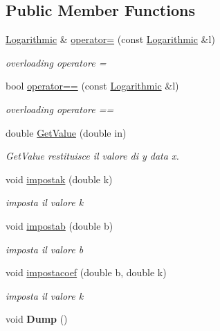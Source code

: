 \subsection*{\-Public \-Member \-Functions}
\begin{DoxyCompactItemize}
\item 
\hypertarget{class_logarithmic_a60e9e7d6a2827bb6af33ac837de86f15}{\hyperlink{class_logarithmic}{\-Logarithmic} \& \hyperlink{class_logarithmic_a60e9e7d6a2827bb6af33ac837de86f15}{operator=} (const \hyperlink{class_logarithmic}{\-Logarithmic} \&l)}\label{class_logarithmic_a60e9e7d6a2827bb6af33ac837de86f15}

\begin{DoxyCompactList}\small\item\em overloading operatore = \end{DoxyCompactList}\item 
\hypertarget{class_logarithmic_a8bdea4843f2fe64c054cd87991cf0f2d}{bool \hyperlink{class_logarithmic_a8bdea4843f2fe64c054cd87991cf0f2d}{operator==} (const \hyperlink{class_logarithmic}{\-Logarithmic} \&l)}\label{class_logarithmic_a8bdea4843f2fe64c054cd87991cf0f2d}

\begin{DoxyCompactList}\small\item\em overloading operatore == \end{DoxyCompactList}\item 
double \hyperlink{class_logarithmic_a1bb4ea5437e634bceb2957f0d0fbcb8f}{\-Get\-Value} (double in)
\begin{DoxyCompactList}\small\item\em \-Get\-Value restituisce il valore di y data x. \end{DoxyCompactList}\item 
void \hyperlink{class_logarithmic_a4294f47b1ecf7e38ed7dde53f8b2c3b5}{impostak} (double k)
\begin{DoxyCompactList}\small\item\em imposta il valore k \end{DoxyCompactList}\item 
void \hyperlink{class_logarithmic_a4d3b80340f2816fd979a6431001bfbc7}{impostab} (double b)
\begin{DoxyCompactList}\small\item\em imposta il valore b \end{DoxyCompactList}\item 
void \hyperlink{class_logarithmic_abcb9f0c7a1efab49773d0029089b94cb}{impostacoef} (double b, double k)
\begin{DoxyCompactList}\small\item\em imposta il valore k \end{DoxyCompactList}\item 
\hypertarget{class_logarithmic_a17f633c7710952945cc5c1a34347280b}{void {\bfseries \-Dump} ()}\label{class_logarithmic_a17f633c7710952945cc5c1a34347280b}

\end{DoxyCompactItemize}

